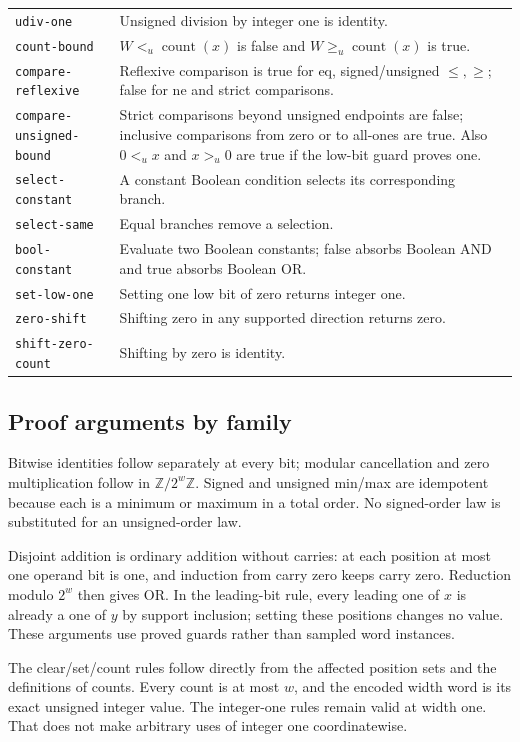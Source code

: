 \begin{longtable}{@{}p{}p{}@{}}
\texttt{udiv-one} & Unsigned division by integer one is identity.\\
\texttt{count-bound} & $W<_{u}\operatorname{count}(x)$ is false and $W\ge_u\operatorname{count}(x)$ is true.\\
\texttt{compare-reflexive} & Reflexive comparison is true for eq, signed/unsigned $\le,\ge$; false for ne and strict comparisons.\\
\texttt{compare-unsigned-bound} & Strict comparisons beyond unsigned endpoints are false; inclusive comparisons from zero or to all-ones are true. Also $0<_u x$ and $x>_u0$ are true if the low-bit guard proves one.\\
\texttt{select-constant} & A constant Boolean condition selects its corresponding branch.\\
\texttt{select-same} & Equal branches remove a selection.\\
\texttt{bool-constant} & Evaluate two Boolean constants; false absorbs Boolean AND and true absorbs Boolean OR.\\
\texttt{set-low-one} & Setting one low bit of zero returns integer one.\\
\texttt{zero-shift} & Shifting zero in any supported direction returns zero.\\
\texttt{shift-zero-count} & Shifting by zero is identity.\\
\end{longtable}
\normalsize

\subsection{Proof arguments by family}
Bitwise identities follow separately at every bit; modular cancellation and zero multiplication follow in $\mathbb Z/2^w\mathbb Z$. Signed and unsigned min/max are idempotent because each is a minimum or maximum in a total order. No signed-order law is substituted for an unsigned-order law.

Disjoint addition is ordinary addition without carries: at each position at most one operand bit is one, and induction from carry zero keeps carry zero. Reduction modulo $2^w$ then gives OR. In the leading-bit rule, every leading one of $x$ is already a one of $y$ by support inclusion; setting these positions changes no value. These arguments use proved guards rather than sampled word instances.

The clear/set/count rules follow directly from the affected position sets and the definitions of counts. Every count is at most $w$, and the encoded width word is its exact unsigned integer value. The integer-one rules remain valid at width one. That does not make arbitrary uses of integer one coordinatewise.


